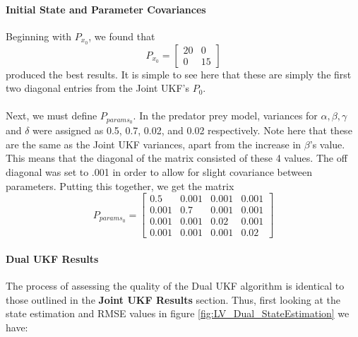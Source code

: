 \paragraph{Initial State and Parameter Covariances}
Beginning with $P_{x_0}$, we found that
\begin{equation}
P_{x_0} = \begin{bmatrix}
20 & 0\\0 & 15\end{bmatrix}
\end{equation}
produced the best results. It is simple to see here that these are simply the first two diagonal entries from the Joint UKF's $P_0$. \\
\\
Next, we must define $P_{params_0}$. In the predator prey model, variances for $\alpha, \beta, \gamma$ and $\delta$ were assigned as 0.5, 0.7, 0.02, and 0.02 respectively. Note here that these are the same as the Joint UKF variances, apart from the increase in $\beta$'s value. This means that the diagonal of the matrix consisted of these 4 values. The off diagonal was set to .001 in order to allow for slight covariance between parameters. Putting this together, we get the matrix
\begin{equation}
P_{params_0} = \begin{bmatrix} 0.5 & 0.001 & 0.001 & 0.001 \\
                                0.001 & 0.7 & 0.001 & 0.001 \\
                                0.001 & 0.001 & 0.02 & 0.001 \\
                                0.001 & 0.001 & 0.001 & 0.02 \end{bmatrix}
\end{equation}
                                
                                

\paragraph{Dual UKF Results}
The process of assessing the quality of the Dual UKF algorithm is identical to those outlined in the \textbf{Joint UKF Results} section. Thus, first looking at the state estimation and RMSE values in figure \ref{fig:LV_Dual_StateEstimation} we have:

